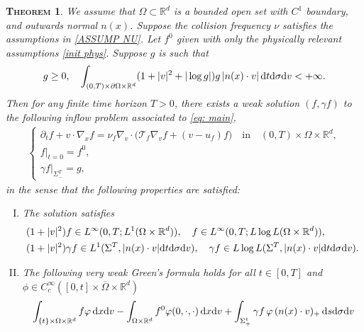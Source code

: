 \documentclass[10pt, reqno]{amsart}
\theoremstyle{plain}
\newtheorem{theorem}{\normalfont \scshape Theorem}[section]
\theoremstyle{definition}
\theoremstyle{remark}
\numberwithin{equation}{section}
\newcommand{\calT}{\mathcal T}
\newcommand{\p}{\partial}
\newcommand{\R}{\mathbb{R}}
\newcommand{\dx}{\textnormal{d}x}
\newcommand{\dv}{\textnormal{d}v}
\newcommand{\dt}{\textnormal{d}t}
\newcommand{\ds}{\textnormal{d}s}
\newcommand{\tnd}{\textnormal{d}}
\begin{document}
\begin{theorem}\label{thm: inflow}
    We assume that $\Omega\subset \R^d$ is a bounded open set with $C^1$ boundary, and outwards normal $n(x)$. Suppose the collision frequency $\nu$ satisfies the assumptions in \eqref{ASSUMP NU}. Let $f^0$ given with only the physically relevant assumptions \eqref{init phys}. Suppose $g$ is such that
    \begin{align*}
        g\ge 0, \quad \int_{(0,T)\times \p\Omega \times \R^d} (1 + |v|^2 + |\log g|) g \,|n(x)\cdot v| \,\dt\tnd\sigma\dv < +\infty.
    \end{align*}
    Then for any finite time horizon $T>0$, there exists a weak solution $(f,\gamma f)$ to the following inflow problem associated to \eqref{eq: main},
    \begin{align} \label{eq: inflow}
        \begin{cases}
            \p_t f + v\cdot \nabla_x f = \nu_f \nabla_v\cdot \Big( \calT_f \nabla_v f + (v- u _f) f \Big) \quad \text{in} \quad (0,T)\times \Omega\times\R^d, \\
            f|_{t=0} = f^0, \\
            \gamma f|_{\Sigma_-^T} = g,
        \end{cases}
    \end{align}
    in the sense that the following properties are satisfied:
    \begin{enumerate}[(I)]
    \item The solution satisfies
    \begin{equation*}
    \begin{split}
        &(1+|v|^2)f \in L^\infty(0,T;L^1(\Omega\times\R^d)), \quad f \in L^\infty(0,T;L\log L(\Omega\times\R^d)), \\
        &(1+|v|^2)\gamma f \in L^1(\Sigma^T, |n(x)\cdot v|\dt\tnd\sigma\dv), \quad \gamma f \in L\log L(\Sigma^T, |n(x)\cdot v|\dt\tnd\sigma\dv).
    \end{split}
    \end{equation*}
    \item The following very weak Green's formula holds for all $t\in [0,T]$ and $\phi\in C_c^\infty([0,t]\times\overline{\Omega}\times\R^d)$
    \begin{equation} \label{very weak}
    \begin{split}
        &\int_{\{t\}\times\Omega\times\R^d} f \varphi \,\dx\dv - \int_{\Omega\times\R^d} f^0 \varphi(0,\cdot,\cdot) \,\dx\dv + \int_{\Sigma_+^t} \gamma f \,\varphi \, (n(x)\cdot v)_+ \,\ds\tnd\sigma\dv \\

\end{split}
\end{equation}
\end{enumerate}
\end{theorem}
\end{document}
